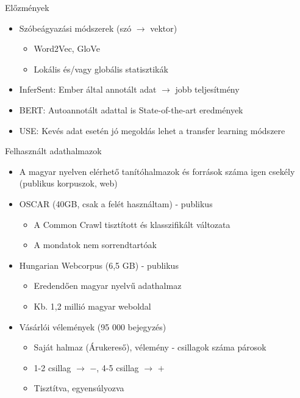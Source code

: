 \documentclass{beamer}
\begin{document}
\begin{frame}{Előzmények}
	
\begin{itemize}
	\item Szóbeágyazási módszerek (szó $\rightarrow$ vektor)
	\begin{itemize}
		\item Word2Vec, GloVe
		\item Lokális és/vagy globális statisztikák
	\end{itemize}
	\item InferSent: Ember által annotált adat $\rightarrow$ jobb teljesítmény
	\item BERT: Autoannotált adattal is State-of-the-art eredmények
	\item USE: Kevés adat esetén jó megoldás lehet a transfer learning módszere
\end{itemize}
	
\end{frame}

\begin{frame}{Felhasznált adathalmazok}
	
\begin{itemize}
	\item A magyar nyelven elérhető tanítóhalmazok és források száma igen csekély (publikus korpuszok, web)
	\item OSCAR (40GB, csak a felét használtam) - publikus
	\begin{itemize}
		\item A Common Crawl tisztított és klasszifikált változata
		\item A mondatok nem sorrendtartóak
	\end{itemize}
	\item Hungarian Webcorpus (6,5 GB) - publikus
	\begin{itemize}
		\item Eredendően magyar nyelvű adathalmaz
		\item Kb. 1,2 millió magyar weboldal
	\end{itemize}
	\item Vásárlói vélemények (95 000 bejegyzés)
	\begin{itemize}
		\item Saját halmaz (Árukereső), vélemény - csillagok száma párosok
		\item 1-2 csillag $\rightarrow$ $-$, 4-5 csillag $\rightarrow$ $+$
		\item Tisztítva, egyensúlyozva
	\end{itemize}
\end{itemize}
	
\end{frame}
\end{document}
